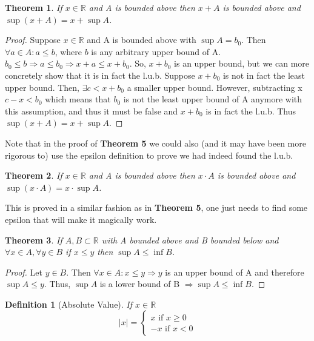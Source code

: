 \documentclass[12pt]{article}
\newtheorem{theorem}{Theorem}
\newtheorem{definition}{Definition}
\begin{document}
\begin{theorem}
    If \(x \in \mathbb R\) and A is bounded above then 
    \(x + A\) is bounded above and \(\sup(x+A) = x+\sup A\).
\end{theorem}

\begin{proof}
    Suppose \(x\in \mathbb R\) and A is bounded above with \(\sup A = b_0\).
    Then \(\forall a \in A: a \leq b\), where \(b\) is any arbitrary upper bound of A. 
    \(b_0 \leq b \Rightarrow a \leq b_0 \Rightarrow x + a \leq x + b_0\). 
    So, \(x + b_0\) is an upper bound, but we can more concretely show that it 
    is in fact the l.u.b. Suppose \(x + b_0\) is not in fact the least upper bound. 
    Then, \(\exists c < x +b_0\) a smaller upper bound. However, subtracting x 
    \(c - x < b_0\) which means that \(b_0\) is not the least upper bound of A anymore 
    with this assumption, and thus it must be false and \(x + b_0\) is in fact the l.u.b.
    Thus \(\sup(x+A) = x+\sup A\).
\end{proof}
\noindent 
Note that in the proof of \textbf{Theorem 5} we could also (and it may have been 
more rigorous to) use the epsilon definition to prove we had indeed found the l.u.b. 

\begin{theorem}
    If \(x \in \mathbb R\) and A is bounded above then 
    \(x \cdot A\) is bounded above and \(\sup(x\cdot A) = x \cdot \sup A\).
\end{theorem}
\noindent
This is proved in a similar fashion as in \textbf{Theorem 5}, one just needs to 
find some epsilon that will make it magically work.

\begin{theorem}
    If \(A,B \subset \mathbb R\) with A bounded above and B bounded below and 
    \(\forall x \in A, \forall y \in B\) if \(x \leq y\) then \(\sup A \leq \inf B\).
\end{theorem}
\begin{proof}
    Let \(y \in B\). Then \(\forall x \in A : x \leq y \Rightarrow y\) is an upper bound 
    of A and therefore \(\sup A \leq y\). Thus, \(\sup A\) is a lower bound of B 
    \(\Rightarrow \sup A \leq \inf B\).
    
\end{proof}

\begin{definition}[Absolute Value]
    If \(x \in \mathbb R\)
    \[ 
        |x| = 
        \begin{cases}
            x \text{ if } x\geq 0 \\ 
            -x \text{ if } x < 0
        \end{cases}
    \]
\end{definition}
\end{document}
